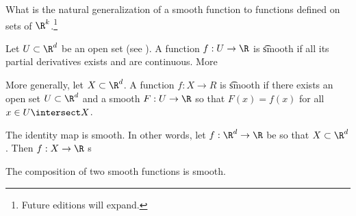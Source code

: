 

What is the natural generalization of a smooth function to functions defined on sets of $\R^k$.\footnote{Future editions will expand.}


Let $U \subset \R^d$ be an open set (see ).
A function $f: U \to \R$ is \t{smooth} if all its partial derivatives exists and are continuous.
More

More generally, let $X \subset \R^d$.
A function $f: X \to R$ is \t{smooth} if there exists an open set $U \subset \R^d$ and a smooth $F: U \to \R$ so that $F(x) = f(x)$ for all $x \in U \intersect X$.



The identity map is smooth.
In other words, let $f: \R^d \to \R$ be so that $X \subset \R^d$.
Then $f: X \to \R$ s


\begin{proposition}
  The composition of two smooth functions is smooth.
\end{proposition}


\blankpage
